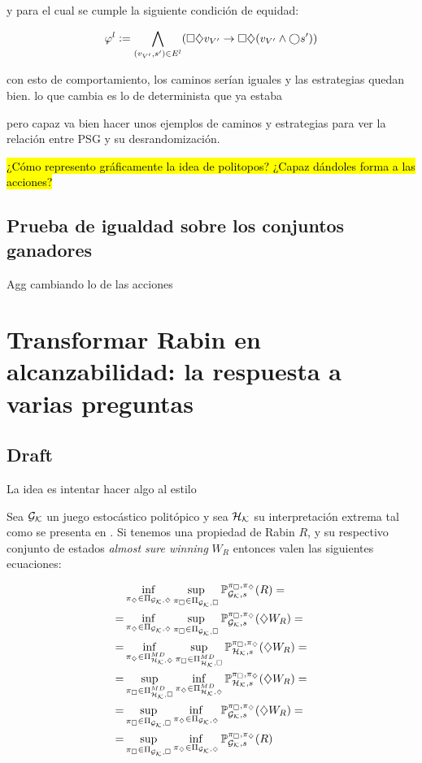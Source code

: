 y para el cual se cumple la siguiente condición de equidad:

$$
	\varphi^l := \bigwedge_{(v_{V'},s') \in E^l} (\siempevent v_{V'} \rightarrow \siempevent (v_{V'} \wedge \bigcirc s' ))
$$

con esto de comportamiento, los caminos serían iguales y las estrategias quedan
bien. lo que cambia es lo de determinista que ya estaba

pero capaz va bien hacer unos ejemplos de caminos y estrategias para ver la
relación entre PSG y su desrandomización.

\hl{¿Cómo represento gráficamente la idea de politopos? ¿Capaz dándoles forma a las acciones?}

\subsection{Prueba de igualdad sobre los conjuntos ganadores}

Agg cambiando lo de las acciones

\section{Transformar Rabin en alcanzabilidad: la respuesta a varias preguntas}

\subsection{Draft}

La idea es intentar hacer algo al estilo

\begin{theorem}
	Sea $\Gk$ un juego estocástico politópico y sea $\Hk$ su interpretación extrema tal como se presenta en \cite{Polytopal}. Si tenemos una propiedad de Rabin $R$, y su respectivo conjunto de estados \textit{almost sure winning} $W_R$ entonces valen las siguientes ecuaciones:

	\begin{align*}
		&\inf_{\piGdiam} \sup_{\piGcuad} \ProbG(R) = \\
		= &\inf_{\piGdiam} \sup_{\piGcuad} \ProbG(\alc W_R) = \\
		= &\inf_{\piHdiamMD} \sup_{\piHcuadMD} \ProbH(\alc W_R) = \\
		= &\sup_{\piHcuadMD} \inf_{\piHdiamMD} \ProbH(\alc W_R) = \\
		= &\sup_{\piGcuad} \inf_{\piGdiam} \ProbG(\alc W_R) = \\
		= &\sup_{\piGcuad} \inf_{\piGdiam} \ProbG(R)
	\end{align*}

\end{theorem}

